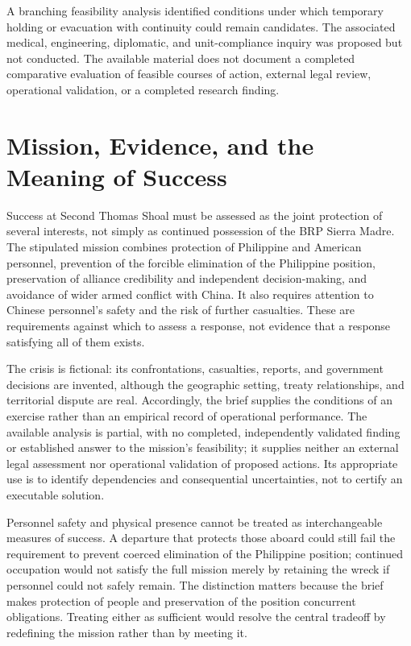 \documentclass[11pt]{article}
\begin{document}
A branching feasibility analysis identified conditions under which temporary holding or evacuation with continuity could remain candidates. The associated medical, engineering, diplomatic, and unit-compliance inquiry was proposed but not conducted. The available material does not document a completed comparative evaluation of feasible courses of action, external legal review, operational validation, or a completed research finding.

\section{Mission, Evidence, and the Meaning of Success}
Success at Second Thomas Shoal must be assessed as the joint protection of several interests, not simply as continued possession of the BRP Sierra Madre. The stipulated mission combines protection of Philippine and American personnel, prevention of the forcible elimination of the Philippine position, preservation of alliance credibility and independent decision-making, and avoidance of wider armed conflict with China. It also requires attention to Chinese personnel\textquoteright{}s safety and the risk of further casualties. These are requirements against which to assess a response, not evidence that a response satisfying all of them exists.

The crisis is fictional: its confrontations, casualties, reports, and government decisions are invented, although the geographic setting, treaty relationships, and territorial dispute are real. Accordingly, the brief supplies the conditions of an exercise rather than an empirical record of operational performance. The available analysis is partial, with no completed, independently validated finding or established answer to the mission\textquoteright{}s feasibility; it supplies neither an external legal assessment nor operational validation of proposed actions. Its appropriate use is to identify dependencies and consequential uncertainties, not to certify an executable solution.

Personnel safety and physical presence cannot be treated as interchangeable measures of success. A departure that protects those aboard could still fail the requirement to prevent coerced elimination of the Philippine position; continued occupation would not satisfy the full mission merely by retaining the wreck if personnel could not safely remain. The distinction matters because the brief makes protection of people and preservation of the position concurrent obligations. Treating either as sufficient would resolve the central tradeoff by redefining the mission rather than by meeting it.
\end{document}
